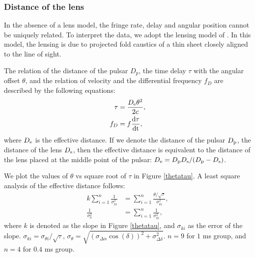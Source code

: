 \documentclass[useAMS,usenatbib]{mn2e}
\begin{document}
\subsubsection{Distance of the lens}
In the absence of a lens model, the
fringe rate, delay and angular position cannot be uniquely related. To interpret the data, we adopt the lensing model of
\citep{2014MNRAS.442.3338P}.  In this model, the lensing is due to projected fold caustics of a thin sheet closely aligned to the line of sight. 

The relation of the distance of the pulsar $D_p$, the time delay $\tau$ with the angular offset $\theta$, and the relation of velocity and the differential frequency $f_D$ are described by the following equations:
\begin{equation}
\begin{aligned}
\tau &=\frac{D_{\rm e}{\theta}^2}{2c}, \\
f_D  &=f\frac{\rm d\tau}{\rm dt},
\end{aligned} 
\end{equation}
where ${D_{\rm e}}$ is the effective distance. If we denote the distance of the pulsar $D_{\rm p}$, the distance of the lens $D_{\rm s}$, then the effective distance is equivalent to the distance of the lens placed at the middle point of the pulsar: $D_{\rm e}={D_{\rm p} D_{\rm s}}/({D_{\rm p} - D_{\rm s}})$. 

We plot the values of $\theta$ vs square root of $\tau$ in Figure \ref{thetatau}. A least square analysis of the effective distance follows:
\begin{equation}
\begin{aligned}
k{\sum\limits_{i=1}^n\frac{1}{\sigma_{ki}^2}}&=\sum\limits_{i=1}^n\frac{\theta/\sqrt{\tau}}{\sigma_{ki}^2},\\
\frac{1}{\sigma_k^2}&=\sum\limits_{i=1}^n\frac{1}{\sigma_{ki}^2},
\end{aligned}
\end{equation}
where $k$ is denoted as the slope in Figure \ref{thetatau}, and $\sigma_{ki}$ as the error of the slope. $\sigma_{ki}=\sigma_{\theta i}/\sqrt{\tau}$, $\sigma_{\theta}=\sqrt{(\sigma_{\Delta\alpha}{\cos(\delta)})^2+\sigma_{\Delta\delta}^2}$. $n=9$ for $1$ ms group, and $n=4$ for $0.4$ ms group. 
\end{document}
